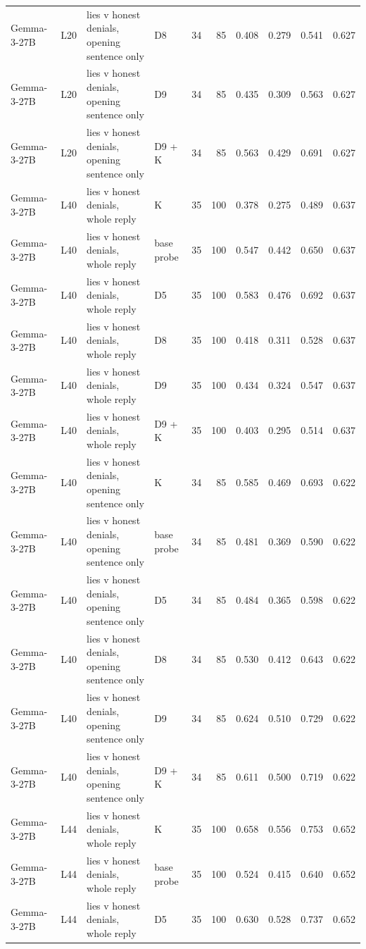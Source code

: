 \begin{table}
\begin{tabular}{llllrrrrrr}
Gemma-3-27B & L20 & lies v honest denials, opening sentence only & D8 & 34 & 85 & 0.408 & 0.279 & 0.541 & 0.627 \\
Gemma-3-27B & L20 & lies v honest denials, opening sentence only & D9 & 34 & 85 & 0.435 & 0.309 & 0.563 & 0.627 \\
Gemma-3-27B & L20 & lies v honest denials, opening sentence only & D9 + K & 34 & 85 & 0.563 & 0.429 & 0.691 & 0.627 \\
Gemma-3-27B & L40 & lies v honest denials, whole reply & K & 35 & 100 & 0.378 & 0.275 & 0.489 & 0.637 \\
Gemma-3-27B & L40 & lies v honest denials, whole reply & base probe & 35 & 100 & 0.547 & 0.442 & 0.650 & 0.637 \\
Gemma-3-27B & L40 & lies v honest denials, whole reply & D5 & 35 & 100 & 0.583 & 0.476 & 0.692 & 0.637 \\
Gemma-3-27B & L40 & lies v honest denials, whole reply & D8 & 35 & 100 & 0.418 & 0.311 & 0.528 & 0.637 \\
Gemma-3-27B & L40 & lies v honest denials, whole reply & D9 & 35 & 100 & 0.434 & 0.324 & 0.547 & 0.637 \\
Gemma-3-27B & L40 & lies v honest denials, whole reply & D9 + K & 35 & 100 & 0.403 & 0.295 & 0.514 & 0.637 \\
Gemma-3-27B & L40 & lies v honest denials, opening sentence only & K & 34 & 85 & 0.585 & 0.469 & 0.693 & 0.622 \\
Gemma-3-27B & L40 & lies v honest denials, opening sentence only & base probe & 34 & 85 & 0.481 & 0.369 & 0.590 & 0.622 \\
Gemma-3-27B & L40 & lies v honest denials, opening sentence only & D5 & 34 & 85 & 0.484 & 0.365 & 0.598 & 0.622 \\
Gemma-3-27B & L40 & lies v honest denials, opening sentence only & D8 & 34 & 85 & 0.530 & 0.412 & 0.643 & 0.622 \\
Gemma-3-27B & L40 & lies v honest denials, opening sentence only & D9 & 34 & 85 & 0.624 & 0.510 & 0.729 & 0.622 \\
Gemma-3-27B & L40 & lies v honest denials, opening sentence only & D9 + K & 34 & 85 & 0.611 & 0.500 & 0.719 & 0.622 \\
Gemma-3-27B & L44 & lies v honest denials, whole reply & K & 35 & 100 & 0.658 & 0.556 & 0.753 & 0.652 \\
Gemma-3-27B & L44 & lies v honest denials, whole reply & base probe & 35 & 100 & 0.524 & 0.415 & 0.640 & 0.652 \\
Gemma-3-27B & L44 & lies v honest denials, whole reply & D5 & 35 & 100 & 0.630 & 0.528 & 0.737 & 0.652 \\

\end{tabular}
\end{table}
